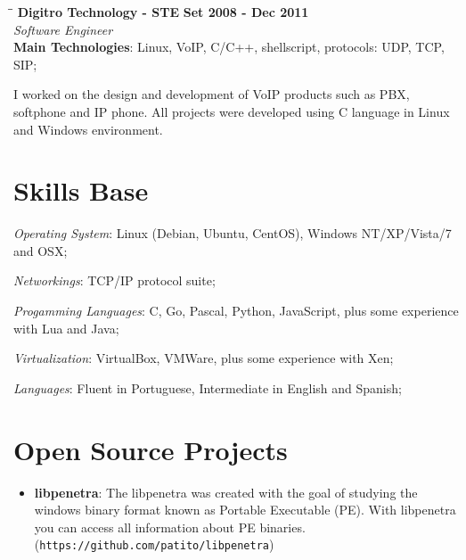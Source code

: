 \documentclass[margin]{res}
\begin{document}
\begin{resume}
   \begin{tabbing}
   \hspace{2.3in}\= \hspace{1.5in}\= \kill %
    \textbf{Digitro Technology - STE}    \>\>\textbf{Set 2008 - Dec 2011}\\
    \textit{Software Engineer}\\   
    \textbf{Main Technologies}: Linux, VoIP, C/C++, shellscript, protocols: UDP, TCP, SIP;
   \end{tabbing}\vspace{-20pt}      %
    \vspace{2mm}
    
    I worked on the design and development of VoIP products such as PBX, softphone and IP phone. 
    All projects were developed using C language in Linux and Windows environment.
    

\section{Skills Base}  \textit{Operating System}:  Linux (Debian, Ubuntu, CentOS), Windows NT/XP/Vista/7 and OSX;

			\textit{Networkings}: TCP/IP protocol suite;
  
			\textit{Progamming Languages}: C, Go, Pascal, Python, JavaScript, plus some experience with Lua and Java;
  
			\textit{Virtualization}: VirtualBox, VMWare, plus some experience with Xen;

			\textit{Languages}: Fluent in Portuguese, Intermediate in English and Spanish;
 
\section{Open Source Projects}
		\begin{itemize}
		    \vspace{2mm}
		    \item \textbf{libpenetra}: The libpenetra was created with the goal of studying the windows binary format 
		                               known as Portable Executable (PE). With libpenetra you can access all information
		                               about PE binaries. (\texttt{https://github.com/patito/libpenetra}) \vspace{1mm}
		                               

\end{itemize}
\end{resume}
\end{document}
